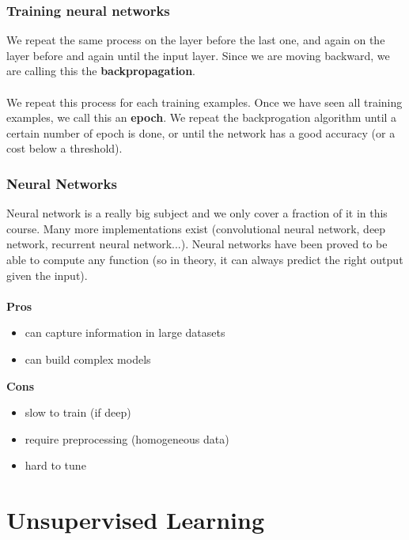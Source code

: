 \documentclass{beamer}
\begin{document}
\begin{frame}
  \frametitle{Training neural networks}
  We repeat the same process on the layer before the last one, and again on the
  layer before and again until the input layer. Since we are moving backward, we are
  calling this the \textbf{backpropagation}.\\~\\

  We repeat this process for each training examples. Once we have seen all
  training examples, we call this an \textbf{epoch}. We repeat the backprogation
  algorithm until a certain number of epoch is done, or until the network has a
  good accuracy (or a cost below a threshold).
\end{frame}

\begin{frame}
  \frametitle{Neural Networks}
  Neural network is a really big subject and we only cover a fraction of it in
  this course. Many more implementations exist (convolutional neural network,
  deep network, recurrent neural network...). Neural networks have been proved
  to be able to compute any function (so in theory, it can always predict the
  right output given the input).
  \\~\\
  \textbf{Pros}
  \begin{itemize}
    \item can capture information in large datasets
    \item can build complex models
  \end{itemize}

  \textbf{Cons}
  \begin{itemize}
    \item slow to train (if deep)
    \item require preprocessing (homogeneous data)
    \item hard to tune
  \end{itemize}
\end{frame}



\section{Unsupervised Learning}

\end{document}
